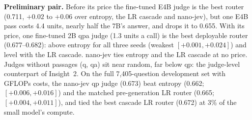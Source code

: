 \documentclass{article}
\begin{document}
\textbf{Preliminary pair.} Before its price the fine-tuned E4B judge is the best router (0.711, $+0.02$ to $+0.06$ over entropy, the LR cascade and nano-jev), but one E4B pass costs 4.4 units, nearly half the 7B's answer, and drops it to 0.655. With its price, one fine-tuned 2B qpa judge (1.3 units a call) is the best deployable router (0.677--0.682): above entropy for all three seeds (weakest $[+0.001, +0.024]$) and level with the LR cascade. nano-jev ties entropy and the LR cascade at no price. Judges without passages (q, qa) sit near random, far below qp: the judge-level counterpart of Insight~2. On the full 7,405-question development set with GFLOPs costs, the nano-jev qp judge (0.673) beat entropy (0.662; $[+0.006, +0.016]$) and the matched pre-generation LR router (0.665; $[+0.004, +0.011]$), and tied the best cascade LR router (0.672) at 3\% of the small model's compute.
\end{document}
